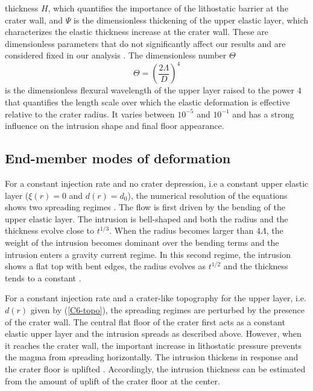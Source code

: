 thickness  $H$, which  quantifies  the importance  of the  lithostatic
barrier at the crater wall, and $\Psi$ is the dimensionless thickening
of the upper elastic layer,  which characterizes the elastic thickness
increase at the crater wall.   These are dimensionless parameters that
do not  significantly affect our  results and are considered  fixed in
our analysis \citep{Thorey:2014cv}.  The dimensionless number $\Theta$
\begin{equation}
  \Theta=\left ( \frac{2\Lambda}{D} \right )^{4}\label{C6-n5}
\end{equation}
is the dimensionless flexural wavelength  of the upper layer raised to
the power $4$ that quantifies the  length scale over which the elastic
deformation  is effective  relative to  the crater  radius. It  varies
between  $10^{-5}$ and  $10^{-1}$ and  has a  strong influence  on the
intrusion shape and final floor appearance.

\subsection{End-member modes of deformation}
\label{C6-sec:end-member-modes-1}

For a constant injection rate and no crater depression, i.e a constant
upper  elastic  layer ($\xi(r)  =  0  $  and  $d(r) =  d_0$),  the
numerical  resolution of  the  equations shows  two spreading  regimes
\citep{Michaut:2011kg,Michaut:2013dr}.   The flow  is first  driven by
the bending of the upper  elastic layer.  The intrusion is bell-shaped
and both the radius and the  thickness evolve close to $t^{1/3}$. When
the radius becomes larger than $4\Lambda$, the weight of the intrusion
becomes dominant  over the  bending terms and  the intrusion  enters a
gravity current regime.  In this  second regime, the intrusion shows a
flat  top with  bent edges,  the radius  evolves as  $t^{1/2}$ and  the
thickness tends to a constant \citep{Huppert:1982a,Michaut:2011kg}.
 
For a  constant injection  rate and a  crater-like topography  for the
upper  layer,  i.e.  $d(r)$  given  by  (\ref{C6-topo}), the  spreading
regimes are perturbed by the presence of the crater wall.  The central
flat floor of the crater first  acts as a constant elastic upper layer
and the intrusion spreads as described above. However, when it reaches
the  crater  wall,  the  important increase  in  lithostatic  pressure
prevents  the  magma  from   spreading  horizontally.   The  intrusion
thickens   in   response   and    the   crater   floor   is   uplifted
\citep{Thorey:2014cv}.   Accordingly, the  intrusion thickness  can be
estimated from the amount of uplift of the crater floor at the center.

